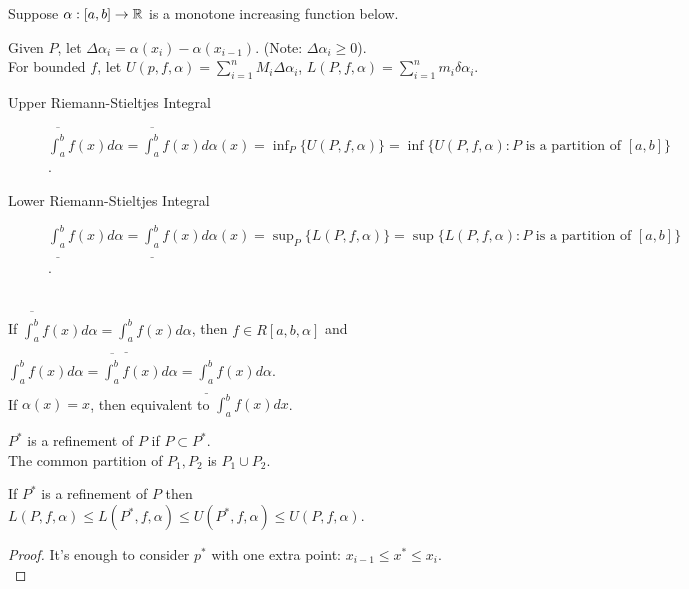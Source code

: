 Suppose $\alpha:[a,b]\to \mathbb{R}$ is a monotone increasing function below.\\
\begin{define}[2]
	Given $P$, let $\Delta \alpha_i=\alpha(x_{i})-\alpha(x_{i-1})$. (Note: $\Delta \alpha_i\ge 0$).\\
	For bounded $f$, let $U(p,f,\alpha)=\sum_{i=1}^{n}{M_{i} \Delta \alpha_i}$, $L(P,f,\alpha)=\sum_{i=1}^{n}{m_{i}}\delta \alpha_i$.\\
	\begin{description}
		\item[Upper Riemann-Stieltjes Integral] $\overline{\int_{a}^{b}}f(x)d\alpha=\overline{\int_{a}^{b}}f(x)d\alpha(x)=\inf_{P}\{U(P,f,\alpha)\}=\inf\{U(P,f,\alpha):P\text{ is a partition of }[a,b]\}$.
		\item[Lower Riemann-Stieltjes Integral] $\underline{\int_{a}^{b}}f(x)d\alpha=\underline{\int_{a}^{b}}f(x)d\alpha(x)=\sup_{P}\{L(P,f,\alpha)\}=\sup\{L(P,f,\alpha):P\text{ is a partition of }[a,b]\}$.
	\end{description}\hfill\\
	If $\overline{\int_{a}^{b}}f(x)d\alpha=\underline{\int_{a}^{b}}f(x)d\alpha$, then $f\in R[a,b,\alpha]$ and $\int_{a}^{b}f(x)d\alpha=\overline{\int_{a}^{b}}f(x)d\alpha=\underline{\int_{a}^{b}}f(x)d\alpha$.\\
	If $\alpha(x)=x$, then equivalent to $\int_{a}^{b}f(x)dx$.
\end{define}

\begin{define}[3]
	$P^{*}$ is a refinement of $P$ if $P\subset P^{*}$.\\
	The common partition of $P_1,P_2$ is $P_1\cup P_2$.\\
\end{define}

\begin{thm}[4]
	If $P^{*}$ is a refinement of $P$ then $L(P,f,\alpha)\le L(P^{*},f,\alpha)\le U(P^{*},f,\alpha)\le U(P,f,\alpha)$.
	\begin{proof}
		It's enough to consider $p^{*}$ with one extra point: $x_{i-1}\le x^{*}\le x_{i}$.\\
	\end{proof}
\end{thm}
